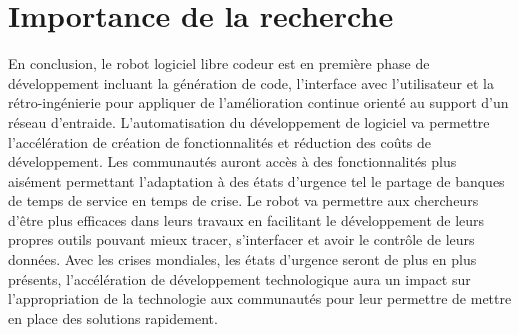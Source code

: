 \section{Importance de la recherche}
En conclusion, le robot logiciel libre codeur est en première phase de développement incluant la génération de code, l'interface avec l'utilisateur et la rétro-ingénierie pour appliquer de l'amélioration continue orienté au support d'un réseau d'entraide. L’automatisation du développement de logiciel va permettre l’accélération de création de fonctionnalités et réduction des coûts de développement. Les communautés auront accès à des fonctionnalités plus aisément permettant l'adaptation à des états d'urgence tel le partage de banques de temps de service en temps de crise. Le robot va permettre aux chercheurs d’être plus efficaces dans leurs travaux en facilitant le développement de leurs propres outils pouvant mieux tracer, s’interfacer et avoir le contrôle de leurs données. Avec les crises mondiales, les états d’urgence seront de plus en plus présents, l’accélération de développement technologique aura un impact sur l’appropriation de la technologie aux communautés pour leur permettre de mettre en place des solutions rapidement.